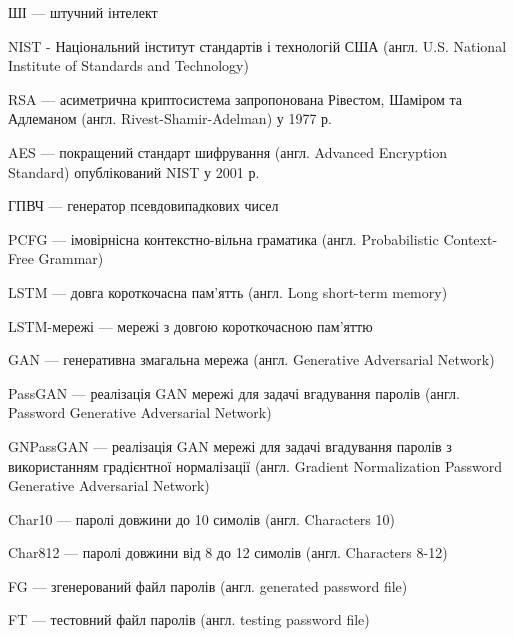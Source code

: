 ШІ --- штучний інтелект

NIST - Національний інститут стандартів і технологій США (англ. U.S. National Institute of Standards and Technology)

RSA --- асиметрична криптосистема запропонована Рівестом, Шаміром та Адлеманом (англ. Rivest-Shamir-Adelman) у 1977 р.

AES --- покращений стандарт шифрування (англ. Advanced Encryption Standard) опублікований NIST  у 2001 р.

ГПВЧ --- генератор псевдовипадкових чисел

PCFG --- імовірнісна контекстно-вільна граматика (англ. Probabilistic Context-Free Grammar)

LSTM --- довга короткочасна пам'ятть (англ. Long short-term memory)

LSTM-мережі --- мережі з довгою короткочасною пам'яттю

GAN --- генеративна змагальна мережа (англ. Generative Adversarial Network)

PassGAN --- реалізація GAN мережі для задачі вгадування паролів (англ. Password Generative Adversarial Network)

GNPassGAN --- реалізація GAN мережі для задачі вгадування паролів з використанням градієнтної нормалізації (англ. Gradient Normalization Password Generative Adversarial Network)

Char10 --- паролі довжини до 10 симолів (англ. Characters 10)

Char812 --- паролі довжини від 8 до 12 симолів (англ. Characters 8-12)

FG --- згенерований файл паролів (англ. generated password file)

FT --- тестовний файл паролів (англ. testing password file)